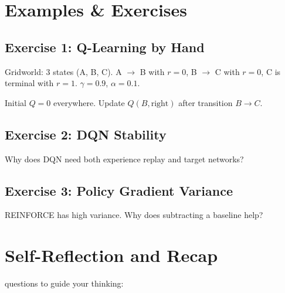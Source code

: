 
\newpage
\section{Examples \& Exercises}

\subsection{Exercise 1: Q-Learning by Hand}

Gridworld: 3 states (A, B, C). A $\to$ B with $r{=}0$, B $\to$ C with $r{=}0$, C is terminal with $r{=}1$. $\gamma = 0.9$, $\alpha = 0.1$.

Initial $Q = 0$ everywhere. Update $Q(B, \text{right})$ after transition $B \to C$.

\subsection{Exercise 2: DQN Stability}

Why does DQN need both experience replay and target networks?

\subsection{Exercise 3: Policy Gradient Variance}

REINFORCE has high variance. Why does subtracting a baseline help?


\fi
\section{Self-Reflection and Recap}

 questions to guide your thinking:

